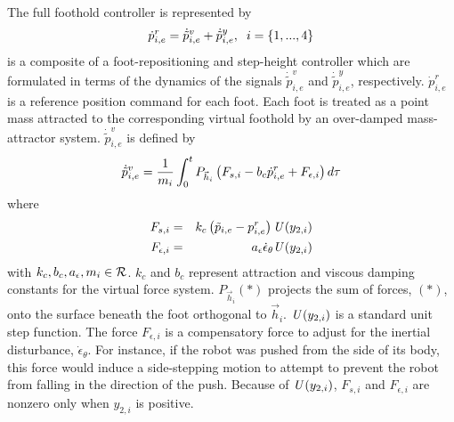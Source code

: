 		The full foothold controller is represented by 
			\begin{equation}
				\dot{p}_{i,e}^{r} = \dot{\tilde{p}}_{i,e}^{v} + \dot{\tilde{p}}_{i,e}^{y}, \hspace{2mm} i = \{1,...,4\}
			\end{equation} 
		is a composite of a foot-repositioning and step-height controller which are formulated in terms of the dynamics of the signals $\dot{\tilde{p}}_{i,e}^{v}$ and $\dot{\tilde{p}}_{i,e}^{y}$, respectively. $\dot{p}_{i,e}^{r}$ is a reference position command for each \Ith foot. Each foot is treated as a point mass attracted to the corresponding virtual foothold by an over-damped mass-attractor system. $\dot{\tilde{p}}_{i,e}^{v}$ is defined by
			\begin{equation}
				\dot{\tilde{p}}_{i,e}^{v} 		= \frac{1}{m_{i}} \int^{t}_{0}{{P}_{\vec{h}_{i}} \left( F_{s,i}  -b_{c} \dot{p}_{i,e}^{r} + F_{\epsilon,i} \right) d\tau}
				\label{eq::foot_place_control}
			\end{equation}
		where
			\begin{eqnarray*}
				F_{s,i} 			& = & k_{c} \left( \tilde{p}_{i,e} - {p}_{i,e}^{r} \right) \emph{U}\left(y_{2,i}\right)		\nonumber\\
				F_{\epsilon,i}		& = & a_{\epsilon}\dot{\epsilon}_{\theta} \emph{U}\left(y_{2,i}\right)						\nonumber
			\end{eqnarray*}
	 	with $k_{c},b_{c},a_{\epsilon},m_{i} \in {\cal R}$.
		$k_{c}$ and $b_{c}$ represent  attraction and viscous damping constants for the virtual force system. ${P}_{\vec{h}_{i}}(*)$ projects the sum of  forces, $(*)$, onto the surface beneath the \Ith foot orthogonal to $\vec{h}_{i}$. $\emph{U}\left(y_{2,i}\right)$ is a standard unit step function. The force $F_{\epsilon,i}$ is a compensatory force to adjust for the inertial disturbance,  $\dot{\epsilon}_{\theta}$. For instance, if the robot was pushed from the side of its body, this force would induce a side-stepping motion to attempt to prevent the robot from falling in the direction of the push. Because of $\emph{U}\left(y_{2,i}\right)$, $F_{s,i}$ and $F_{\epsilon,i}$ are nonzero only when $y_{2,i}$ is positive.

